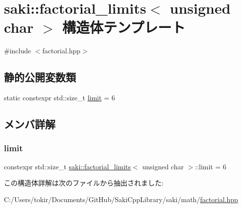 \hypertarget{structsaki_1_1factorial__limits_3_01unsigned_01char_01_4}{}\section{saki\+:\+:factorial\+\_\+limits$<$ unsigned char $>$ 構造体テンプレート}
\label{structsaki_1_1factorial__limits_3_01unsigned_01char_01_4}


{\ttfamily \#include $<$factorial.\+hpp$>$}

\subsection*{静的公開変数類}
\begin{DoxyCompactItemize}
\item 
static constexpr std\+::size\+\_\+t \mbox{\hyperlink{structsaki_1_1factorial__limits_3_01unsigned_01char_01_4_a4062994479e513651e5692ec85439e72}{limit}} = 6
\end{DoxyCompactItemize}


\subsection{メンバ詳解}
\mbox{\label{structsaki_1_1factorial__limits_3_01unsigned_01char_01_4_a4062994479e513651e5692ec85439e72}} 
\subsubsection{\texorpdfstring{limit}{limit}}
{\footnotesize\ttfamily constexpr std\+::size\+\_\+t \mbox{\hyperlink{structsaki_1_1factorial__limits}{saki\+::factorial\+\_\+limits}}$<$ unsigned char $>$\+::limit = 6\hspace{0.3cm}{\ttfamily [static]}}



この構造体詳解は次のファイルから抽出されました\+:\begin{DoxyCompactItemize}
\item 
C\+:/\+Users/tokir/\+Documents/\+Git\+Hub/\+Saki\+Cpp\+Library/saki/math/\mbox{\hyperlink{factorial_8hpp}{factorial.\+hpp}}\end{DoxyCompactItemize}
